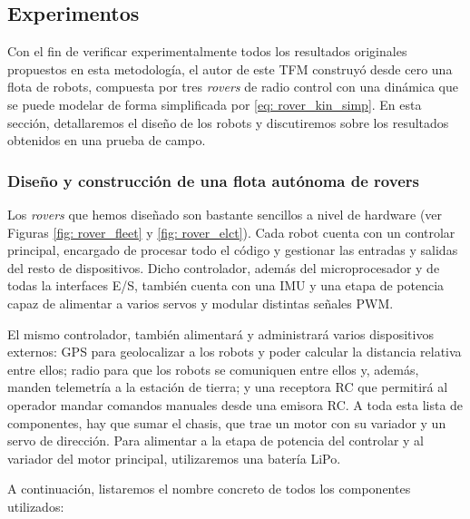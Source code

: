 
\subsection{Experimentos}

Con el fin de verificar experimentalmente todos los resultados originales propuestos en esta metodología, el autor de este TFM construyó desde cero una flota de robots, compuesta por tres \textit{rovers} de radio control con una dinámica que se puede modelar de forma simplificada por \eqref{eq: rover_kin_simp}. En esta sección, detallaremos el diseño de los robots y discutiremos sobre los resultados obtenidos en una prueba de campo.

\subsubsection{Diseño y construcción de una flota autónoma de rovers}

Los \textit{rovers} que hemos diseñado son bastante sencillos a nivel de hardware (ver Figuras \ref{fig: rover_fleet} y \ref{fig: rover_elct}). Cada robot cuenta con un controlar principal, encargado de procesar todo el código y gestionar las entradas y salidas del resto de dispositivos. Dicho controlador, además del microprocesador y de todas la interfaces E/S, también cuenta con una IMU y una etapa de potencia capaz de alimentar a varios servos y modular distintas señales PWM. 

El mismo controlador, también alimentará y administrará varios dispositivos externos: GPS para geolocalizar a los robots y poder calcular la distancia relativa entre ellos; radio para que los robots se comuniquen entre ellos y, además, manden telemetría a la estación de tierra; y una receptora RC que permitirá al operador mandar comandos manuales desde una emisora RC. A toda esta lista de componentes, hay que sumar el chasis, que trae un motor con su variador y un servo de dirección. Para alimentar a la etapa de potencia del controlar y al variador del motor principal, utilizaremos una batería LiPo.

\newpage

A continuación, listaremos el nombre concreto de todos los componentes utilizados:

